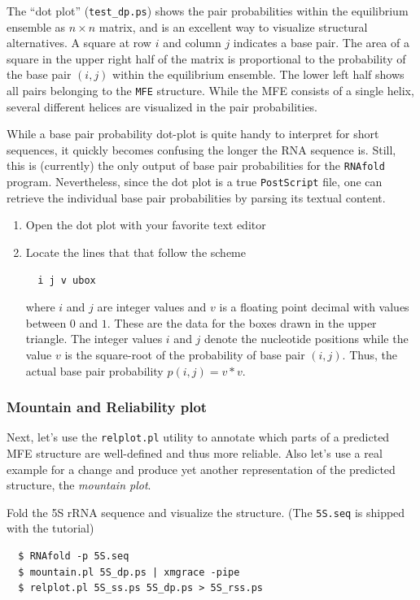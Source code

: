 \documentclass[a4paper]{article}
\begin{document}
The ``dot plot'' (\texttt{test\_dp.ps}) shows the pair probabilities within
the equilibrium ensemble as $n\times n$ matrix, and is an excellent way to
visualize structural alternatives. A square at row $i$ and column $j$
indicates a base pair. The area of a square in the upper right half of the
matrix is proportional to the probability of the base pair $(i,j)$ within the
equilibrium ensemble. The lower left half shows all pairs belonging to
the \texttt{MFE} structure. While the MFE consists of a single helix, several
different helices are visualized in the pair probabilities.

While a base pair probability dot-plot is quite handy to interpret for short
sequences, it quickly becomes confusing the longer the RNA sequence is. Still,
this is (currently) the only output of base pair probabilities for the \texttt{RNAfold}
program. Nevertheless, since the dot plot is a true \texttt{PostScript} file,
one can retrieve the individual base pair probabilities by parsing its textual
content.

\begin{enumerate}
\item Open the dot plot with your favorite text editor
\item Locate the lines that that follow the scheme
\begin{verbatim}
  i j v ubox
\end{verbatim}
where $i$ and $j$ are integer values and $v$ is a floating point decimal
with values between $0$ and $1$. These are the data for the boxes drawn in
the upper triangle. The integer values $i$ and $j$ denote the nucleotide positions
while the value $v$ is the square-root of the probability of base pair $(i,j)$.
Thus, the actual base pair probability $p(i,j) = v * v$.

\end{enumerate}

\subsubsection{Mountain and Reliability plot}
Next, let's use the \texttt{relplot.pl} utility to annotate which parts of a
predicted MFE structure are well-defined and thus more reliable. Also let's use a real 
example for a change and produce yet another representation of the predicted 
structure, the \emph{mountain plot}.

\noindent
Fold the 5S rRNA sequence and visualize the structure. (The \texttt{5S.seq} is shipped with the tutorial)
\begin{verbatim}
  $ RNAfold -p 5S.seq
  $ mountain.pl 5S_dp.ps | xmgrace -pipe
  $ relplot.pl 5S_ss.ps 5S_dp.ps > 5S_rss.ps
\end{verbatim}
\end{document}
